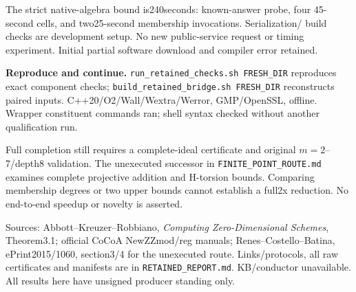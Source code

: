 \documentclass[10pt]{article}
\begin{document}
The strict native-algebra bound is240seconds: known-answer probe, four
45-second cells, and two25-second membership invocations. Serialization/
build checks are development setup. No new public-service request or timing
experiment. Initial partial software download and compiler error retained.

\textbf{Reproduce and continue.}
\texttt{run\_retained\_checks.sh FRESH\_DIR} reproduces exact component
checks; \texttt{build\_retained\_bridge.sh FRESH\_DIR} reconstructs paired
inputs. C++20/O2/Wall/Wextra/Werror, GMP/OpenSSL, offline. Wrapper constituent
commands ran; shell syntax checked without another qualification run.

Full completion still requires a complete-ideal certificate and original
$m=2$--7/depth8 validation. The unexecuted successor in
\texttt{FINITE\_POINT\_ROUTE.md} examines complete projective addition and
H-torsion bounds. Comparing membership degrees or two upper bounds cannot
establish a full2x reduction. No end-to-end speedup or novelty is asserted.

Sources: Abbott--Kreuzer--Robbiano, \emph{Computing Zero-Dimensional Schemes},
Theorem3.1; official CoCoA NewZZmod/reg manuals; Renes--Costello--Batina,
ePrint2015/1060, section3/4 for the unexecuted route. Links/protocols, all raw
certificates and manifests are in \texttt{RETAINED\_REPORT.md}. KB/conductor
unavailable. All results here have unsigned producer standing only.
\end{document}
